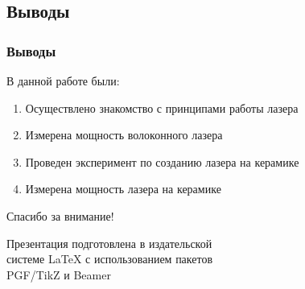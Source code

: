 \documentclass[10pt,pdf,hyperref={unicode}, dvipsnames]{beamer}
\newcommand\frametitless[1]{\subsection{#1}\frametitle{#1}}
\begin{document}
\begin{frame}
	\frametitless{Выводы}
	В данной работе были:
	\begin{enumerate}
		\item Осуществлено знакомство с принципами работы  лазера
		\item Измерена мощность волоконного лазера
		\item Проведен эксперимент по созданию лазера на керамике
		\item Измерена мощность лазера на керамике
	\end{enumerate}
\end{frame}


\begin{frame}[plain]
	\vspace{4cm}
	\begin{center}
		\Huge
		Спасибо за внимание!
	\end{center}
	\vspace{2.5cm}
	\begin{center}
		\color{black!30!white}
		Презентация подготовлена в издательской \\
		системе LaTeX с использованием пакетов \\
		PGF/TikZ и Beamer
	\end{center}
\end{frame}
\end{document}
